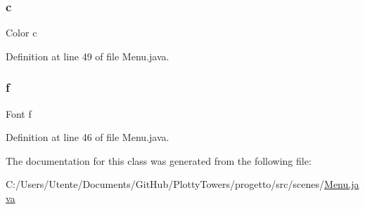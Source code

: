 \subsubsection{\texorpdfstring{c}{c}}
{\footnotesize\ttfamily Color c\hspace{0.3cm}{\ttfamily [private]}}



Definition at line 49 of file Menu.\+java.

\mbox{\label{classscenes_1_1_menu_a3fb562f10e8f7f83cb2ed130eab6d439}} 
\subsubsection{\texorpdfstring{f}{f}}
{\footnotesize\ttfamily Font f\hspace{0.3cm}{\ttfamily [private]}}



Definition at line 46 of file Menu.\+java.



The documentation for this class was generated from the following file\+:\begin{DoxyCompactItemize}
\item 
C\+:/\+Users/\+Utente/\+Documents/\+Git\+Hub/\+Plotty\+Towers/progetto/src/scenes/\hyperlink{_menu_8java}{Menu.\+java}\end{DoxyCompactItemize}
